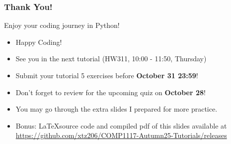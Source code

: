 \documentclass{beamer}
\begin{document}
\begin{frame}
    \frametitle{Thank You!}

    Enjoy your coding journey in Python!

    \begin{itemize}
        \item Happy Coding!
        \item See you in the next tutorial (HW311, 10:00 - 11:50, Thursday)
        \item Submit your tutorial 5 exercises before \textbf{October 31 23:59}!
        \item Don't forget to review for the upcoming quiz on \textbf{October 28}!
        \item You may go through the extra slides I prepared for more practice.

        \item Bonus: \LaTeX source code and compiled pdf of this slides available at
              \href{https://github.com/xtz206/COMP1117-Autumn25-Tutorials/releases}
              {https://github.com/xtz206/COMP1117-Autumn25-Tutorials/releases}
    \end{itemize}
\end{frame}
\end{document}
